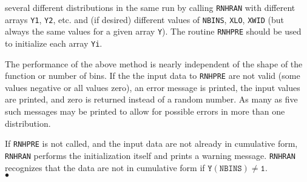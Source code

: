several different distributions in the same run by calling {\tt RNHRAN}
with different arrays {\tt Y1}, {\tt Y2}, etc. and (if desired)
different values of {\tt NBINS},
{\tt XLO}, {\tt XWID} (but always the same values for a given array
{\tt Y}). The routine {\tt  RNHPRE} should be used to initialize each
array {\tt Yi}.
\par
The performance of the above method is nearly independent of the shape
of the function or number of bins.
\Errorh
If the the input data to {\tt RNHPRE} are not valid (some values
negative or all values zero), an error message is printed, the input
values are printed, and zero is returned instead of a random number.
As many as five such messages may be printed to allow for possible
errors in more than one distribution.
\par
If {\tt RNHPRE} is not called, and the input data are not already in
cumulative form, {\tt RNHRAN} performs the initialization itself and
prints a warning message. {\tt RNHRAN} recognizes that the data are not
in cumulative form if $\mathtt{Y(NBINS) \ne 1}$.
\\ $\bullet$

